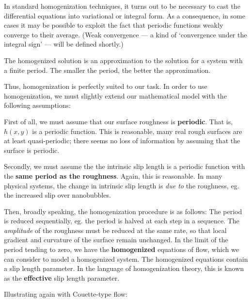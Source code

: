 \documentclass[12pt, a4paper, twoside, openright]{book}
\begin{document}
In standard homogenization techniques, it turns out to be necessary to cast the differential equations into variational or integral form.  As a consequence, in some cases it may be possible to exploit the fact that periodic functions weakly converge to their average.  (Weak convergence --- a kind of `convergence under the integral sign' --- will be defined shortly.)

The homogenized solution is an approximation to the solution for a system with a finite period.  The smaller the period, the better the approximation.



\vspace{1em}
Thus, homogenization is perfectly suited to our task.  
In order to use homogenization, we must slightly extend our mathematical model with the following assumptions:

\vspace{1em}
First of all, we must assume that our surface roughness is \textbf{periodic}.  That is, $h(x,y)$ is a periodic function.  This is reasonable, many real rough surfaces are at least quasi-periodic; there seems no loss of information by assuming that the surface is periodic.

Secondly, we must assume the the intrinsic slip length is a periodic function with the \textbf{same period as the roughness}.  Again, this is reasonable.   In many physical systems, the change in intrinsic slip length is \emph{due to} the roughness, eg. the increased slip over nanobubbles.

\vspace{1em}
Then, broadly speaking, the homogenization procedure is as follows:
The period is reduced sequentially, eg. the period is halved at each step in a sequence.
The \emph{amplitude} of the roughness must be reduced at the same rate, so that local gradient and curvature of the surface remain unchanged.  In the limit of the period tending to zero, we have the \textbf{homogenized} equations of flow, which we can consider to model a homogenized system.  The homogenized equations contain a slip length parameter.  In the language of homogenization theory, this is known as the \textbf{effective} slip length parameter.

Illustrating again with Couette-type flow:
\end{document}
